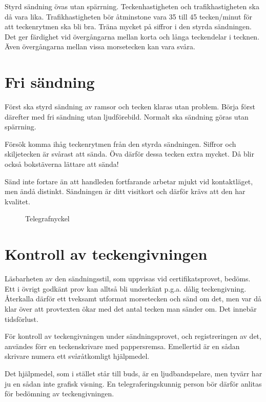 Styrd sändning övas utan spärrning.
Teckenhastigheten och trafikhastigheten ska då vara lika.
Trafikhastigheten bör åtminstone vara 35 till 45 tecken/minut för
att teckenrytmen ska bli bra.
Träna mycket på siffror i den styrda sändningen.
Det ger färdighet vid övergångarna mellan korta och långa teckendelar i tecknen.
Även övergångarna mellan vissa morsetecken kan vara svåra.

\section{Fri sändning}

Först ska styrd sändning av ramsor och tecken klaras utan problem.
Börja först därefter med fri sändning utan ljudförebild.
Normalt ska sändning göras utan spärrning.

Försök komma ihåg teckenrytmen från den styrda sändningen.
Siffror och skiljetecken är svårast att sända.
Öva därför dessa tecken extra mycket.
Då blir också bokstäverna lättare att sända!

Sänd inte fortare än att handleden fortfarande arbetar mjukt vid kontaktläget,
men ändå distinkt.
Sändningen är ditt visitkort och därför krävs att den har kvalitet.

\begin{figure}
  \caption{Telegrafnyckel}
  \label{fig:bild_morse_6}
\end{figure}

\section[Teckengivning]{Kontroll av teckengivningen}

Läsbarheten av den sändningsstil, som uppvisas vid certifikatsprovet, bedöms.
Ett i övrigt godkänt prov kan alltså bli underkänt p.g.a. dålig teckengivning.
Återkalla därför ett tveksamt utformat morsetecken och sänd om det, men var då
klar över att provtexten ökar med det antal tecken man sänder om.
Det innebär tidsförlust.

För kontroll av teckengivningen under sändningsprovet, och registreringen av
det, användes förr en teckenskrivare med pappersremsa.
Emellertid är en sådan skrivare numera ett svåråtkomligt hjälpmedel.

Det hjälpmedel, som i stället står till buds, är en ljudbandspelare, men tyvärr
har ju en sådan inte grafisk visning.
En telegraferingskunnig person bör därför anlitas för bedömning av
teckengivningen.

